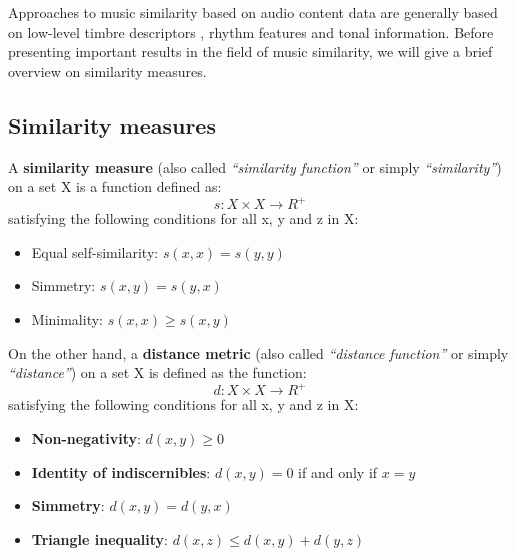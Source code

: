 Approaches to music similarity based on audio content data are generally based on low-level timbre descriptors \cite{aucou04}, rhythm features and tonal information. 
Before presenting important results in the field of music similarity, we will give a brief overview on similarity measures. 
\subsection*{Similarity measures}
A \textbf{similarity measure} (also called \textit{``similarity function''} or simply \textit{``similarity''}) on a set X is a function defined as:
\begin{equation}
s : X \times X \rightarrow R^+
\end{equation}
satisfying the following conditions for all x, y and z in X:
\begin{itemize}
\item Equal self-similarity: $s(x,x) = s(y,y)$
\item Simmetry: $s(x,y) = s(y,x)$
\item Minimality: $s(x,x) \geq s(x,y)$
\end{itemize}

On the other hand, a \textbf{distance metric} (also called \textit{``distance function''} or simply \textit{``distance''}) on a set X is defined as the function:
\begin{equation}
d : X \times X \rightarrow R^+
\end{equation}
satisfying the following conditions for all x, y and z in X:
\begin{itemize}
\item \textbf{Non-negativity}: $d(x,y) \geq 0$
\item \textbf{Identity of indiscernibles}: $d(x,y) = 0$ if and only if $x=y$
\item \textbf{Simmetry}: $d(x,y) = d(y,x)$
\item \textbf{Triangle inequality}: $d(x,z) \leq d(x,y) + d(y,z)$
\end{itemize}

